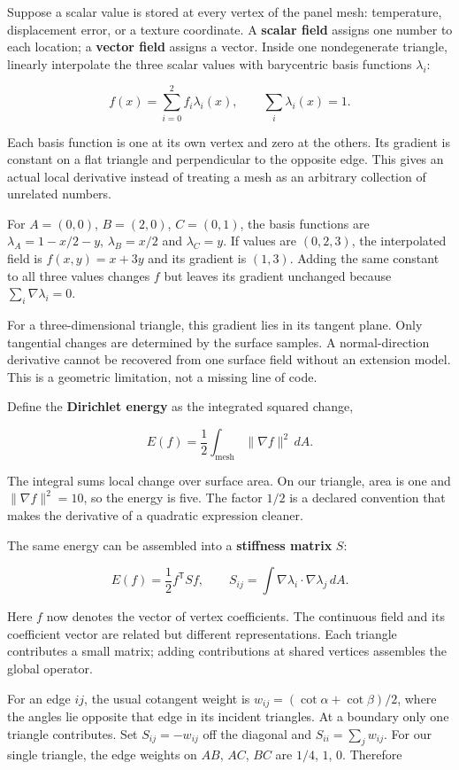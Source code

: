 Suppose a scalar value is stored at every vertex of the panel mesh: temperature, displacement error, or a texture coordinate. A \textbf{scalar field} assigns one number to each location; a \textbf{vector field} assigns a vector. Inside one nondegenerate triangle, linearly interpolate the three scalar values with barycentric basis functions \(\lambda_i\):

\[
f(x)=\sum_{i=0}^2 f_i\lambda_i(x),\qquad
\sum_i\lambda_i(x)=1.
\]

Each basis function is one at its own vertex and zero at the others. Its gradient is constant on a flat triangle and perpendicular to the opposite edge. This gives an actual local derivative instead of treating a mesh as an arbitrary collection of unrelated numbers.

For \(A=(0,0)\), \(B=(2,0)\), \(C=(0,1)\), the basis functions are \(\lambda_A=1-x/2-y\), \(\lambda_B=x/2\) and \(\lambda_C=y\). If values are \((0,2,3)\), the interpolated field is \(f(x,y)=x+3y\) and its gradient is \((1,3)\). Adding the same constant to all three values changes \(f\) but leaves its gradient unchanged because \(\sum_i\nabla\lambda_i=0\).

For a three-dimensional triangle, this gradient lies in its tangent plane. Only tangential changes are determined by the surface samples. A normal-direction derivative cannot be recovered from one surface field without an extension model. This is a geometric limitation, not a missing line of code.

Define the \textbf{Dirichlet energy} as the integrated squared change,

\[
E(f)=\frac12\int_{\text{mesh}}\|\nabla f\|^2\,dA.
\]

The integral sums local change over surface area. On our triangle, area is one and \(\|\nabla f\|^2=10\), so the energy is five. The factor \(1/2\) is a declared convention that makes the derivative of a quadratic expression cleaner.

The same energy can be assembled into a \textbf{stiffness matrix} \(S\):

\[
E(f)=\frac12 f^{\mathsf T}Sf,\qquad
S_{ij}=\int\nabla\lambda_i\cdot\nabla\lambda_j\,dA.
\]

Here \(f\) now denotes the vector of vertex coefficients. The continuous field and its coefficient vector are related but different representations. Each triangle contributes a small matrix; adding contributions at shared vertices assembles the global operator.

For an edge \(ij\), the usual cotangent weight is \(w_{ij}=(\cot\alpha+\cot\beta)/2\), where the angles lie opposite that edge in its incident triangles. At a boundary only one triangle contributes. Set \(S_{ij}=-w_{ij}\) off the diagonal and \(S_{ii}=\sum_jw_{ij}\). For our single triangle, the edge weights on \(AB\), \(AC\), \(BC\) are \(1/4\), \(1\), \(0\). Therefore

